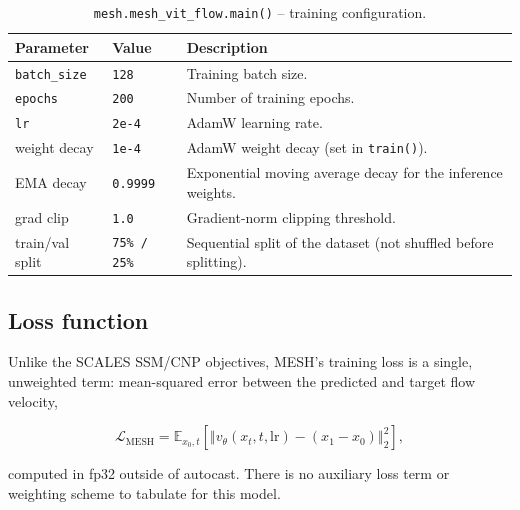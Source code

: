 \documentclass[11pt]{article}
\begin{document}
\begin{table}[h]
\centering
\caption{\texttt{mesh.mesh\_vit\_flow.main()} -- training configuration.}
\begin{tabular}{@{}llL{7cm}@{}}
\toprule
Parameter & Value & Description \\
\midrule
\texttt{batch\_size} & \texttt{128}  & Training batch size. \\
\texttt{epochs}      & \texttt{200}  & Number of training epochs. \\
\texttt{lr}          & \texttt{2e-4} & AdamW learning rate. \\
weight decay         & \texttt{1e-4} & AdamW weight decay (set in \texttt{train()}). \\
EMA decay            & \texttt{0.9999} & Exponential moving average decay for the inference weights. \\
grad clip            & \texttt{1.0}  & Gradient-norm clipping threshold. \\
train/val split       & \texttt{75\% / 25\%} & Sequential split of the dataset (not shuffled before splitting). \\
\bottomrule
\end{tabular}
\end{table}

\subsection{Loss function}

Unlike the SCALES SSM/CNP objectives, MESH's training loss is a single,
unweighted term: mean-squared error between the predicted and target flow
velocity,

\begin{equation}
\mathcal{L}_{\mathrm{MESH}} = \mathbb{E}_{x_0, t}\left[\left\Vert
  v_\theta(x_t, t, \mathrm{lr}) - (x_1 - x_0) \right\Vert_2^2\right],
\end{equation}

computed in fp32 outside of autocast. There is no auxiliary loss term or
weighting scheme to tabulate for this model.
\end{document}
